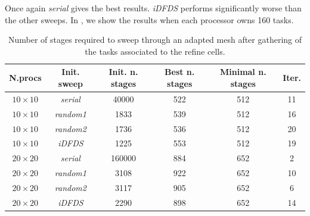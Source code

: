 \documentclass[letterpaper]{article}
\renewcommand{\(}{\left(}
\renewcommand{\)}{\right)}
\renewcommand{\[}{\left[}
\renewcommand{\]}{\right]}
\begin{document}
Once again \emph{serial} gives the best results. \emph{iDFDS} performs
significantly worse than the other sweeps. In , we show the results
when each processor owns 160 tasks.
\begin{table}[H]
  \begin{center}
    \begin{tabular}{|c|c|c|c|c|c|}
      \hline
      N.procs & Init. sweep & Init. n. stages & Best n. stages & Minimal n. stages & Iter. \\
      \hline
      $10 \times 10$ &  \emph{serial} &  40000 &  522 & 512 & 11 \\
      $10 \times 10$ & \emph{random1} &   1833 &  539 & 512 & 16 \\
      $10 \times 10$ & \emph{random2} &   1736 &  536 & 512 & 20 \\
      $10 \times 10$ &   \emph{iDFDS} &   1225 &  553 & 512 & 19 \\
      $20 \times 20$ &  \emph{serial} & 160000 &  884 & 652 &  2 \\
      $20 \times 20$ & \emph{random1} &   3108 &  922 & 652 & 10 \\
      $20 \times 20$ & \emph{random2} &   3117 &  905 & 652 &  6 \\  
      $20 \times 20$ &   \emph{iDFDS} &   2290 &  898 & 652 & 14 \\
      \hline
    \end{tabular}
    \caption{Number of stages required to sweep through an adapted mesh after
    gathering of the tasks associated to the refine cells.}
    \label{band_2}
  \end{center}
\end{table}
\end{document}
